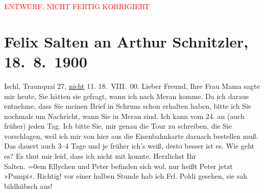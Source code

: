 
\begin{center}
            \textcolor{red}{ENTWURF, NICHT FERTIG KORRIGIERT}
                      \end{center}
            
         
         \renewcommand{\erwaehntePersonen}{Personen: Caroline Kotter, Ottmar Peter Kotter, Leopoldine Müller, Louise Schnitzler}
         \renewcommand{\erwaehnteOrte}{Orte: Bad Ischl, Meran, Schruns, Traunkai}
         \renewcommand{\erwaehnteWerke}{}
               \section[Felix Salten an Arthur Schnitzler, 18. 8. 1900]{ Felix Salten an Arthur Schnitzler, 18. 8. 1900}\nopagebreak{}\rehead{ }\begin{ledgroupsized}[t]{13cm}\normalsize\beginnumbering \toendnotes[C]{\smallbreak\pagebreak[2]} 
\toendnotes[C]{\smallbreak}\pstart
           \raggedleft{}{\pb}Ischl, Traunquai 27, \uline{nicht} 11. \pend
           \pstart
           \raggedleft{}18. VIII. 00. \pend
           \pstart
           Lieber Freund, Ihre Frau Mama sagte mir heute, Sie hätten sie gefragt, wann ich nach
                  Meran komme. Da ich daraus entnehme, dass
               Sie meinen Brief in Schruns schon erhalten
               haben, bitte ich Sie nochmals um Nachricht, wann Sie in Meran sind. Ich kann vom 24. an (auch früher)
               jeden Tag. Ich bitte Sie, mir genau die Tour zu schreiben, die Sie vorschlagen, weil
               ich mir von hier aus die Eisenbahnkarte darnach bestellen muß. Das dauert auch 3–4
               Tage und je früher ich’s weiß, desto besser ist es. Wie geht es? Es thut mir leid,
               dass ich nicht mit konnte. \pend
           \pstart
            Herzlichst Ihr {\\[\baselineskip]}\spacefill\mbox{Salten.}\pend
           \leftskip=0em{}\pstart
           \noindent{}Ellychen und Peter befinden sich wol, nur heißt Peter jetzt »Pumpi«. \pend
           \pstart
           Richtig! vor einer {\pb}halben
                  Stunde hab ich Frl. Poldi gesehen, sie sah
                  bildhübsch aus! \pend
           

\end{ledgroupsized}

